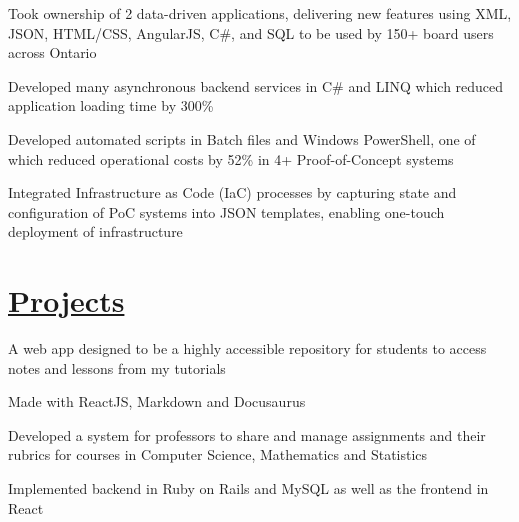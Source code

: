 \documentclass[]{deedy-resume}
\begin{document}
\begin{tightemize}
\item Took ownership of 2 data-driven applications, delivering new features using XML, JSON, HTML/CSS, AngularJS, C\#, and SQL to be used by 150+ board users across Ontario
\item Developed many asynchronous backend services in C\# and LINQ which reduced application loading time by 300\%
\end{tightemize}
\sectionsep

\begin{tightemize}
\item Developed automated scripts in Batch files and Windows PowerShell, one of which reduced operational costs by 52\% in 4+ Proof-of-Concept systems
\item Integrated Infrastructure as Code (IaC) processes by capturing state and configuration of PoC systems into JSON templates, enabling one-touch deployment of infrastructure
\end{tightemize}
\sectionsep


\section{\href{https://github.com/ItsMeWithTheFace}{Projects}}

\begin{tightemize}
\item A web app designed to be a highly accessible repository for students to access notes and lessons from my tutorials
\item Made with ReactJS, Markdown and Docusaurus
\end{tightemize}
\sectionsep

\location{}
\begin{tightemize}
\item Developed a system for professors to share and manage assignments and their rubrics for courses in Computer Science, Mathematics and Statistics
\item Implemented backend in Ruby on Rails and MySQL as well as the frontend in React
\end{tightemize}
\sectionsep
\end{document}
